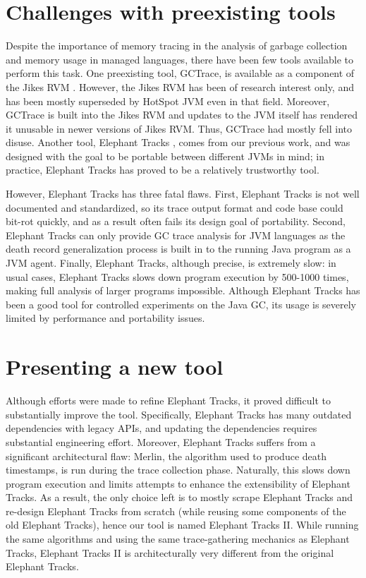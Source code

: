 \section{Challenges with preexisting tools}
Despite the importance of memory tracing in the analysis of garbage collection and memory usage in managed languages, there have
been few tools available to perform this task. One preexisting tool, GCTrace, is available as a component of the Jikes RVM \citep{JikesRVM}. However,
the Jikes RVM has been of research interest only, and has been mostly superseded by HotSpot JVM even in that field. Moreover, GCTrace
is built into the Jikes RVM and updates to the JVM itself has rendered it unusable in newer versions of Jikes RVM. Thus, GCTrace had
mostly fell into disuse. Another tool, Elephant Tracks \citep{ElephantTracks}, comes from our previous work, and was designed with
the goal to be portable between different JVMs in mind; in practice, Elephant Tracks has proved to be a relatively trustworthy tool.

However, Elephant Tracks has three fatal flaws. First, Elephant Tracks is not well documented and standardized, so its trace output
format and code base could bit-rot quickly, and as a result often fails its design goal of portability. Second, Elephant Tracks can
only provide GC trace analysis for JVM languages as the death record generalization process is built in to the running Java program
as a JVM agent. Finally, Elephant Tracks, although precise, is extremely slow: in usual cases, Elephant Tracks slows down program execution
by 500-1000 times, making full analysis of larger programs impossible. Although Elephant Tracks has been a good tool for controlled
experiments on the Java GC, its usage is severely limited by performance and portability issues.


\section{Presenting a new tool}
Although efforts were made to refine Elephant Tracks, it proved difficult to substantially improve the tool. Specifically, Elephant Tracks
has many outdated dependencies with legacy APIs, and updating the dependencies requires substantial engineering effort. Moreover,
Elephant Tracks suffers from a significant architectural flaw: Merlin, the algorithm used to produce death timestamps,
is run during the trace collection phase. Naturally, this slows down program execution and limits attempts to enhance the extensibility
of Elephant Tracks. As a result, the only choice left is to mostly scrape Elephant Tracks and re-design Elephant Tracks from scratch
(while reusing some components of the old Elephant Tracks), hence our tool is named Elephant Tracks II. While running the same algorithms and
using the same trace-gathering mechanics as Elephant Tracks, Elephant Tracks II is architecturally very different from the original Elephant
Tracks.

